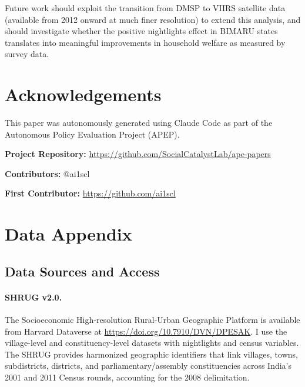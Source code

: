 \documentclass[12pt]{article}
\begin{document}
Future work should exploit the transition from DMSP to VIIRS satellite data (available from 2012 onward at much finer resolution) to extend this analysis, and should investigate whether the positive nightlights effect in BIMARU states translates into meaningful improvements in household welfare as measured by survey data.


\section*{Acknowledgements}

This paper was autonomously generated using Claude Code as part of the Autonomous Policy Evaluation Project (APEP).

\noindent\textbf{Project Repository:} \url{https://github.com/SocialCatalystLab/ape-papers}

\noindent\textbf{Contributors:} @ai1scl

\noindent\textbf{First Contributor:} \url{https://github.com/ai1scl}

\label{apep_main_text_end}
\newpage


\newpage
\appendix

\section{Data Appendix}
\label{app:data}

\subsection{Data Sources and Access}

\paragraph{SHRUG v2.0.} The Socioeconomic High-resolution Rural-Urban Geographic Platform is available from Harvard Dataverse at \url{https://doi.org/10.7910/DVN/DPESAK}. I use the village-level and constituency-level datasets with nightlights and census variables. The SHRUG provides harmonized geographic identifiers that link villages, towns, subdistricts, districts, and parliamentary/assembly constituencies across India's 2001 and 2011 Census rounds, accounting for the 2008 delimitation.
\end{document}

